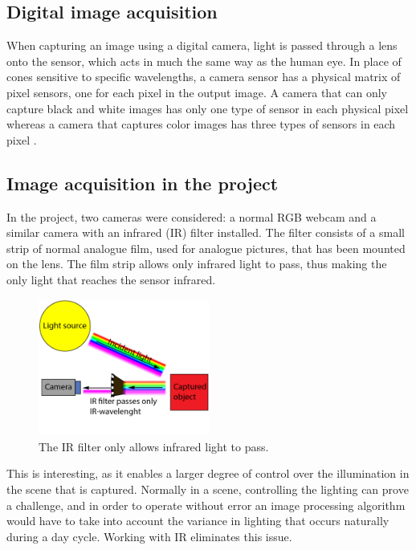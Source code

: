 \subsection{Digital image acquisition}
When capturing an image using a digital camera, light is passed through a lens onto the sensor, which acts in much the same way as the human eye. In place of cones sensitive to specific wavelengths, a camera sensor has a physical matrix of pixel sensors, one for each pixel in the output image. A camera that can only capture black and white images has only one type of sensor in each physical pixel whereas a camera that captures color images has three types of sensors in each pixel \citep{ip_book}.

\subsection{Image acquisition in the project}
In the project, two cameras were considered: a normal RGB webcam and a similar camera with an infrared (IR) filter installed. The filter consists of a small strip of normal analogue film, used for analogue pictures, that has been mounted on the lens. The film strip allows only infrared light to pass, thus making the only light that reaches the sensor infrared.

\begin{figure}[htbp] 
\centering 
\includegraphics[width=0.5\textwidth]{Pictures/Theory/IR_filter.png} 
\caption{The IR filter only allows infrared light to pass.} 
\label{fig:ir_filter} 
\end{figure}

This is interesting, as it enables a larger degree of control over the illumination in the scene that is captured. Normally in a scene, controlling the lighting \citep{ip_book} can prove a challenge, and in order to operate without error an image processing algorithm would have to take into account the variance in lighting that occurs naturally during a day cycle. Working with IR eliminates this issue.

